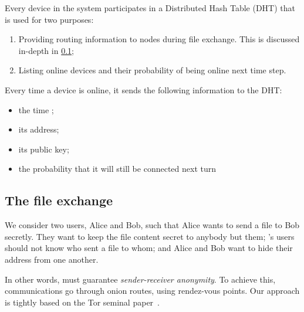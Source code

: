 
Every device in the system participates in a Distributed Hash Table (DHT) that is used for two purposes:
\begin{enumerate}
  \item Providing routing information to nodes during file exchange. This is 
    discussed in-depth in \cref{file-exchange};
	\item Listing online devices and their probability of being online next time step.
\end{enumerate}

Every time a device is online, it sends the following information to the DHT:
\begin{itemize}
	\item the time ;
	\item its address;
	\item its public key;
	\item the probability that it will still be connected next turn 
\end{itemize}


\subsection{The file exchange}%
\label{file-exchange}

We consider two users, Alice and Bob, such that Alice wants to send a file to Bob secretly.
They want to keep the file content secret to anybody but them; \name's users should not know who sent a file to whom; and Alice and Bob want to hide their address from one another.

In other words, \name must guarantee \emph{sender-receiver anonymity}.
To achieve this, communications go through onion routes, using rendez-vous points.
Our approach is tightly based on the Tor seminal paper~\cite{Tor}.

